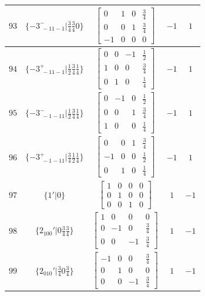 \documentclass[fleqn,8pt]{jsarticle}
\begin{document}
\begin{longtable}{ccccc}
$ 93 $ & $ \{-3^{-}_{\,\,-11-1}|\frac{3}{4} \frac{3}{4} 0\} $ & $ \begin{bmatrix} 0 & 1 & 0 & \frac{3}{4} \\ 0 & 0 & 1 & \frac{3}{4} \\ -1 & 0 & 0 & 0 \end{bmatrix} $ & $ -1 $ & $ 1 $ \\ \hline
$ 94 $ & $ \{-3^{+}_{\,\,-11-1}|\frac{1}{2} \frac{3}{4} \frac{1}{4}\} $ & $ \begin{bmatrix} 0 & 0 & -1 & \frac{1}{2} \\ 1 & 0 & 0 & \frac{3}{4} \\ 0 & 1 & 0 & \frac{1}{4} \end{bmatrix} $ & $ -1 $ & $ 1 $ \\ \hline
$ 95 $ & $ \{-3^{-}_{\,\,-1-11}|\frac{1}{2} \frac{3}{4} \frac{1}{4}\} $ & $ \begin{bmatrix} 0 & -1 & 0 & \frac{1}{2} \\ 0 & 0 & 1 & \frac{3}{4} \\ 1 & 0 & 0 & \frac{1}{4} \end{bmatrix} $ & $ -1 $ & $ 1 $ \\ \hline
$ 96 $ & $ \{-3^{+}_{\,\,-1-11}|\frac{3}{4} \frac{1}{2} \frac{1}{4}\} $ & $ \begin{bmatrix} 0 & 0 & 1 & \frac{3}{4} \\ -1 & 0 & 0 & \frac{1}{2} \\ 0 & 1 & 0 & \frac{1}{4} \end{bmatrix} $ & $ -1 $ & $ 1 $ \\ \hline
$ 97 $ & $ \{1{}'|0\} $ & $ \begin{bmatrix} 1 & 0 & 0 & 0 \\ 0 & 1 & 0 & 0 \\ 0 & 0 & 1 & 0 \end{bmatrix} $ & $ 1 $ & $ -1 $ \\ \hline
$ 98 $ & $ \{2{}_{100}{}'|0 \frac{3}{4} \frac{3}{4}\} $ & $ \begin{bmatrix} 1 & 0 & 0 & 0 \\ 0 & -1 & 0 & \frac{3}{4} \\ 0 & 0 & -1 & \frac{3}{4} \end{bmatrix} $ & $ 1 $ & $ -1 $ \\ \hline
$ 99 $ & $ \{2{}_{010}{}'|\frac{3}{4} 0 \frac{3}{4}\} $ & $ \begin{bmatrix} -1 & 0 & 0 & \frac{3}{4} \\ 0 & 1 & 0 & 0 \\ 0 & 0 & -1 & \frac{3}{4} \end{bmatrix} $ & $ 1 $ & $ -1 $ \\ \hline

\end{longtable}
\end{document}
